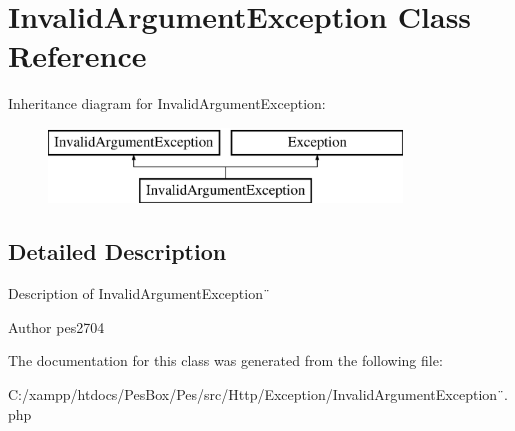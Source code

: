 \hypertarget{class_pes_1_1_http_1_1_exception_1_1_invalid_argument_exception}{}\section{Invalid\+Argument\+Exception Class Reference}
\label{class_pes_1_1_http_1_1_exception_1_1_invalid_argument_exception}
Inheritance diagram for Invalid\+Argument\+Exception\+:\begin{figure}[H]
\begin{center}
\leavevmode
\includegraphics[height=2.000000cm]{class_pes_1_1_http_1_1_exception_1_1_invalid_argument_exception}
\end{center}
\end{figure}


\subsection{Detailed Description}
Description of Invalid\+Argument\+Exception¨

\begin{DoxyAuthor}{Author}
pes2704 
\end{DoxyAuthor}


The documentation for this class was generated from the following file\+:\begin{DoxyCompactItemize}
\item 
C\+:/xampp/htdocs/\+Pes\+Box/\+Pes/src/\+Http/\+Exception/Invalid\+Argument\+Exception¨.\+php\end{DoxyCompactItemize}
